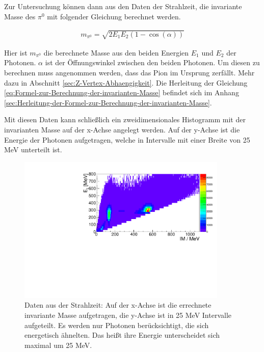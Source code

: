 \documentclass[a4paper,11pt,oneside,final,german,openbib,pdftex]{scrbook}
\begin{document}
{Zur Untersuchung k\"onnen dann aus den Daten der Strahlzeit, die invariante Masse des $\pi^0$ mit folgender Gleichung berechnet werden.

 \begin{equation}
 \begin{split}
 {m_{\pi^0}=\sqrt{2E_1E_2(1-\cos(\alpha))}}
 \label{eq:Formel-zur-Berechnung-der-invarianten-Masse}
 \end{split}
 \end{equation}

Hier ist $m_{\pi^0}$ die berechnete Masse aus den beiden Energien $E_1$ und $E_2$ der Photonen. $\alpha$ ist der \"Offnungswinkel zwischen den beiden Photonen. Um diesen zu berechnen muss angenommen werden, dass das Pion im Ursprung zerf\"allt. Mehr dazu in Abschnitt \ref{sec:Z-Vertex-Abhaengigkeit}.
Die Herleitung der Gleichung \ref{eq:Formel-zur-Berechnung-der-invarianten-Masse} befindet sich im Anhang \ref{sec:Herleitung-der-Formel-zur-Berechnung-der-invarianten-Masse}.

Mit diesen Daten kann schließlich ein zweidimensionales Histogramm mit der invarianten Masse auf der x-Achse angelegt werden. Auf der y-Achse ist die Energie der Photonen aufgetragen, welche in Intervalle mit einer Breite von 25 MeV unterteilt ist. 


\begin{figure}[h!]
	\begin{center}
		\includegraphics[width=100mm]{NewCalib/Strahlzeit2014/20171904Uncharged2DHist}
	
		\caption[Strahlzeit: 2D-Histogramm; Symmetrische Photonen]{Daten aus der Strahlzeit: Auf der x-Achse ist die errechnete invariante Masse aufgetragen, die y-Achse ist in 25 MeV Intervalle aufgeteilt. Es werden nur Photonen ber\"ucksichtigt, die sich energetisch \"ahnelten. Das hei{\ss}t ihre Energie unterscheidet sich maximal um 25 MeV.}
			\label{fig:Energy-Interval-Hist-All-Bins}
	\end{center}
\end{figure}

}
\end{document}
